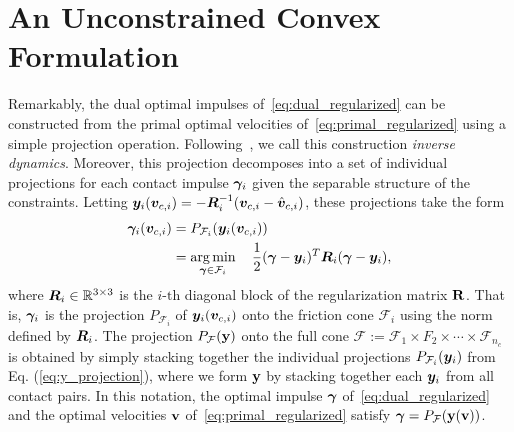 \section{An Unconstrained Convex Formulation}
\label{sec:unconstrained_convex_formulation}
Remarkably,  the dual optimal impulses of~\eqref{eq:dual_regularized} can be
constructed from the primal optimal velocities of~\eqref{eq:primal_regularized}
using a simple projection operation. Following~\cite{bib:todorov2014}, we call
this construction  \textit{inverse dynamics}. Moreover, this projection
decomposes into a set of individual projections for each contact impulse
${\bm\gamma}_i$ given the separable structure of the constraints. Letting
${\bm{y}}_i({\bm{v}}_{c,i}) = -{\bm{R}}_i^{-1}({\bm{v}}_{c,i}-\hat{{\bm{v}}}_{c,i})$,
these projections take the form
\begin{equation}
  \begin{aligned}
	\bgamma_i(\vf{v}_{c,i})&= P_{\mathcal{F}_i}(\vf{y}_i(\vf{v}_{c,i}))\\
	&= \argmin_{\bgamma\in\mathcal{F}_i} \quad 
		\frac{1}{2}(\bgamma-\vf{y}_i)^T\vf{R}_i(\bgamma-\vf{y}_i),\\
	\end{aligned}
	\label{eq:y_projection}
\end{equation}
where ${\bm{R}}_i\in\mathbb{R}^{3\times3}$ is the $i\text{-th}$ diagonal block of
the regularization matrix ${\mathbf{R}}$. That is, ${\bm\gamma}_i$ is the projection
$P_{\mathcal{F}_i}$ of ${\bm{y}}_i({\bm{v}}_{c,i})$ onto the friction cone
$\mathcal{F}_i$ using the norm defined by ${\bm{R}}_i$. The projection
$P_{\mathcal{F}}({\mathbf{y}})$ onto the full cone $\mathcal{F} := \mathcal{F}_1
\times F_2 \times \cdots \times \mathcal{F}_{n_c}$ is obtained by simply
stacking together the individual projections $P_{\mathcal{F}_i}({\bm{y}}_i)$ from
Eq. (\ref{eq:y_projection}), where we form ${\mathbf{y}}$ by stacking together each
${\bm{y}}_i$ from all contact pairs.  In this notation, the optimal impulse
${\bm\gamma}$ of~\eqref{eq:dual_regularized} and the optimal velocities ${\mathbf{v}}$
of~\eqref{eq:primal_regularized} satisfy  ${\bm\gamma} =
P_{\mathcal{F}}({\mathbf{y}}({\mathbf{v}}))$.

